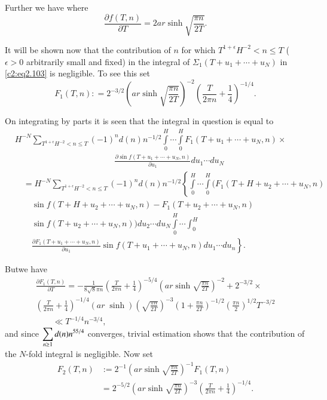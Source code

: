 Further we have
{}
where
$$
\frac{\partial f(T, n)}{\partial T}= 2 ar \sinh \sqrt{\frac{\pi n}{2T}}.
$$

It will be shown now that the contribution of $n$ for which $T^{1+
  \epsilon} H^{-2} < n\leq T$ ($\epsilon > 0$ arbitrarily small and
fixed) in the integral of $\Sigma_1(T+ u_1 + \cdots + u_N)$ in
\eqref{c2:eq2.103} is negligible. To see this set
$$
F_1 (T, n): = 2^{-3/2} \left( ar \sinh \sqrt{\frac{\pi n}{2T}}
  \right)^{-2} \left(\frac{T}{2\pi n} + \frac{1}{4}\right)^{-1/4}.
$$

On integrating by parts it is seen that the integral in question is
equal to 
{\fontsize{10}{12}\selectfont
\begin{align*}
&   H^{-N} \sum_{T^{1+ \epsilon}H^{-2} < n \leq T} (-1)^n d(n) n^{-1/2}
  \int\limits_0^H \cdots \int\limits_0^H F_1 (T 
  + u_1 + \cdots + u_N , n)\times\\
& \hspace{5cm} \frac{\partial \sin f(T + u_1 + \cdots +
    u_N, n)}{\partial u_1} du_1 \cdots du_N\\
 &\quad  = H^{-N} \sum_{T^{1+\epsilon} H^{-2} < n \leq T} (-1)^n d(n)
  n^{-1/2} \left\{ \int\limits_0^H \cdots \int\limits_0^H (F_1 (T + H +
  u_2 + \cdots + u_N, n) \right.\\
& \qquad   \sin f(T + H + u_2 + \cdots + u_N, n) 
   - F_1 (T+ u_2 + \cdots + u_N, n) \\
& \qquad \sin f (T + u_2 + \cdots + u_N ,  n)) du_2 \cdots du_N
  \int\limits_0^H \cdots \int_0^H \\
& \qquad \left. \frac{\partial F_1 (T+ u_1 +
    \cdots + u_N , n)}{\partial u_1} \sin f(T+ u_1 + \cdots + u_N, n)
  du_1 \cdots du_n \right\}.
\end{align*}}

But\pageoriginale we have 
\begin{multline*}
  \frac{\partial F_1 (T, n)}{\partial T} =- \frac{1}{8\sqrt{8} \pi n}
  \left( \frac{T}{2 \pi n} + \frac{1}{4}\right)^{-5/4} \left(ar\sinh
  \sqrt{\frac{\pi n}{2 T}}\right)^{-2} + 2^{-3/2}\times\\ 
  \left(\frac{T}{2 \pi n} + \frac{1}{4} \right)^{-1/4} (ar \; \sinh)
  \left( \sqrt{\frac{\pi n}{2T}}\right)^{-3} \left(1+ \frac{\pi n}{2T}
  \right)^{-1/2} \left(\frac{\pi n}{2} \right)^{1/2} T^{-3/2}\\ 
\qquad\ll T^{-1/4} n^{-3/4}, 
\end{multline*}
and since $\displaystyle{\sum_{n \geq 1} d(n) n^{5\-5/4}}$ converges,
trivial estimation shows that the contribution of the $N$-fold
integral is negligible. Now set
\begin{align*} 
F_2 (T, n) &:= 2^{-1} \left(ar \sinh \sqrt{\frac{\pi n}{2T}}
\right)^{-1} F_1 (T, n)\\ 
&= 2^{-5/2} \left(ar \sinh \sqrt{\frac{\pi n}{2T}} \right)^{-3}
\left(\frac{T}{2 \pi n} + \frac{1}{4} \right)^{-1/4}.
\end{align*}

